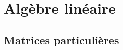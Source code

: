 \newcommand{\alglin}{/home/robin/ENSEIGN/Cours/MathBiologie/L3-ENS-Math1/Exercices/AlgLin}

\section{Algèbre linéaire} 


% 










\subsection{Matrices particulières}%

% 


